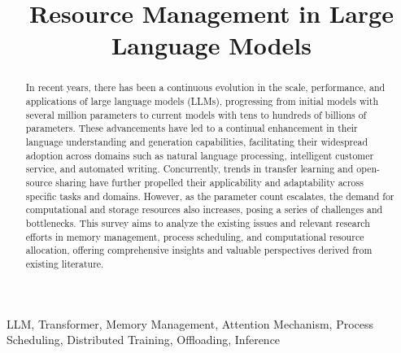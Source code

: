 \documentclass[conference]{IEEEtran}
\begin{document}
\title{Resource Management in Large Language Models\\
}

\author{
    \and
    \and
}

\maketitle

\begin{abstract}
    In recent years, there has been a continuous evolution in the scale, performance, and applications of large language models (LLMs),
    progressing from initial models with several million parameters to current models with tens to hundreds of billions of parameters.
    These advancements have led to a continual enhancement in their language understanding and generation capabilities, facilitating their
    widespread adoption across domains such as natural language processing, intelligent customer service, and automated writing.
    Concurrently, trends in transfer learning and open-source sharing have further propelled their applicability and adaptability
    across specific tasks and domains. However, as the parameter count escalates, the demand for computational and storage resources also increases,
    posing a series of challenges and bottlenecks. This survey aims to analyze the existing issues and relevant research efforts in memory management, process scheduling, and computational resource allocation, offering comprehensive insights and valuable perspectives derived from existing literature.
\end{abstract}

\begin{IEEEkeywords}
    LLM, Transformer, Memory Management, Attention Mechanism, Process Scheduling, Distributed Training, Offloading, Inference
\end{IEEEkeywords}
\end{document}
